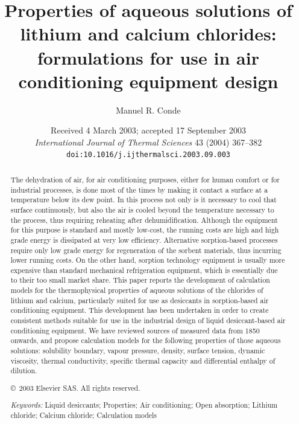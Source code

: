 \documentclass[11pt]{article}
\title{Properties of aqueous solutions of lithium and calcium chlorides:\\
formulations for use in air conditioning equipment design}
\author[1]{Manuel R. Conde}
\affil[1]{M. Conde Engineering, Eugen-Huber-Str.\ 61, CH-8048 Z\"urich, Switzerland}
\date{Received 4 March 2003; accepted 17 September 2003 \\[1ex]
\textit{International Journal of Thermal Sciences} 43 (2004) 367--382 \\
\texttt{doi:10.1016/j.ijthermalsci.2003.09.003}}
\begin{document}
\maketitle

\begin{abstract}
The dehydration of air, for air conditioning purposes, either for human comfort or for
industrial processes, is done most of the times by making it contact a surface at a
temperature below its dew point. In this process not only is it necessary to cool that
surface continuously, but also the air is cooled beyond the temperature necessary to the
process, thus requiring reheating after dehumidification. Although the equipment for this
purpose is standard and mostly low-cost, the running costs are high and high grade energy
is dissipated at very low efficiency. Alternative sorption-based processes require only low
grade energy for regeneration of the sorbent materials, thus incurring lower running costs.
On the other hand, sorption technology equipment is usually more expensive than standard
mechanical refrigeration equipment, which is essentially due to their too small market
share. This paper reports the development of calculation models for the thermophysical
properties of aqueous solutions of the chlorides of lithium and calcium, particularly
suited for use as desiccants in sorption-based air conditioning equipment. This development
has been undertaken in order to create consistent methods suitable for use in the
industrial design of liquid desiccant-based air conditioning equipment. We have reviewed
sources of measured data from 1850 onwards, and propose calculation models for the
following properties of those aqueous solutions: solubility boundary, vapour pressure,
density, surface tension, dynamic viscosity, thermal conductivity, specific thermal
capacity and differential enthalpy of dilution.

\medskip
\noindent \copyright\ 2003 Elsevier SAS. All rights reserved.

\medskip
\noindent \textit{Keywords:} Liquid desiccants; Properties; Air conditioning; Open
absorption; Lithium chloride; Calcium chloride; Calculation models
\end{abstract}
\end{document}
